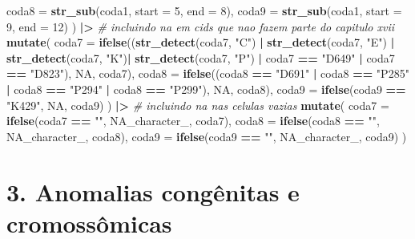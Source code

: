 \documentclass[
]{article}
\newenvironment{Shaded}{\begin{snugshade}}{\end{snugshade}}
\newcommand{\AttributeTok}[1]{\textcolor[rgb]{0.13,0.29,0.53}{#1}}
\newcommand{\CommentTok}[1]{\textcolor[rgb]{0.56,0.35,0.01}{\textit{#1}}}
\newcommand{\ConstantTok}[1]{\textcolor[rgb]{0.56,0.35,0.01}{#1}}
\newcommand{\DecValTok}[1]{\textcolor[rgb]{0.00,0.00,0.81}{#1}}
\newcommand{\FunctionTok}[1]{\textcolor[rgb]{0.13,0.29,0.53}{\textbf{#1}}}
\newcommand{\NormalTok}[1]{#1}
\newcommand{\SpecialCharTok}[1]{\textcolor[rgb]{0.81,0.36,0.00}{\textbf{#1}}}
\newcommand{\StringTok}[1]{\textcolor[rgb]{0.31,0.60,0.02}{#1}}
\begin{document}
\begin{Shaded}
\begin{Highlighting}[]
    \AttributeTok{coda8 =} \FunctionTok{str\_sub}\NormalTok{(coda1, }\AttributeTok{start =} \DecValTok{5}\NormalTok{, }\AttributeTok{end =} \DecValTok{8}\NormalTok{),}
    \AttributeTok{coda9 =} \FunctionTok{str\_sub}\NormalTok{(coda1, }\AttributeTok{start =} \DecValTok{9}\NormalTok{, }\AttributeTok{end =} \DecValTok{12}\NormalTok{)}
\NormalTok{  ) }\SpecialCharTok{|\textgreater{}}
  \CommentTok{\# incluindo na em cids que nao fazem parte do capitulo xvii}
  \FunctionTok{mutate}\NormalTok{(}
    \AttributeTok{coda7 =} \FunctionTok{ifelse}\NormalTok{((}\FunctionTok{str\_detect}\NormalTok{(coda7, }\StringTok{"C"}\NormalTok{) }\SpecialCharTok{|} \FunctionTok{str\_detect}\NormalTok{(coda7, }\StringTok{"E"}\NormalTok{) }\SpecialCharTok{|}
                     \FunctionTok{str\_detect}\NormalTok{(coda7, }\StringTok{"K"}\NormalTok{)}\SpecialCharTok{|} \FunctionTok{str\_detect}\NormalTok{(coda7, }\StringTok{"P"}\NormalTok{) }\SpecialCharTok{|}
\NormalTok{                      coda7 }\SpecialCharTok{==} \StringTok{"D649"} \SpecialCharTok{|}\NormalTok{ coda7 }\SpecialCharTok{==} \StringTok{"D823"}\NormalTok{), }\ConstantTok{NA}\NormalTok{, coda7),}
    \AttributeTok{coda8 =} \FunctionTok{ifelse}\NormalTok{((coda8 }\SpecialCharTok{==} \StringTok{"D691"} \SpecialCharTok{|}\NormalTok{ coda8 }\SpecialCharTok{==} \StringTok{"P285"} \SpecialCharTok{|}\NormalTok{ coda8 }\SpecialCharTok{==} \StringTok{"P294"} \SpecialCharTok{|}
\NormalTok{                     coda8 }\SpecialCharTok{==} \StringTok{"P299"}\NormalTok{), }\ConstantTok{NA}\NormalTok{, coda8),}
    \AttributeTok{coda9 =} \FunctionTok{ifelse}\NormalTok{(coda9 }\SpecialCharTok{==} \StringTok{"K429"}\NormalTok{, }\ConstantTok{NA}\NormalTok{, coda9)}
\NormalTok{  ) }\SpecialCharTok{|\textgreater{}}
  \CommentTok{\# incluindo na nas celulas vazias}
  \FunctionTok{mutate}\NormalTok{(}
    \AttributeTok{coda7 =} \FunctionTok{ifelse}\NormalTok{(coda7 }\SpecialCharTok{==} \StringTok{""}\NormalTok{, }\ConstantTok{NA\_character\_}\NormalTok{, coda7),}
    \AttributeTok{coda8 =} \FunctionTok{ifelse}\NormalTok{(coda8 }\SpecialCharTok{==} \StringTok{""}\NormalTok{, }\ConstantTok{NA\_character\_}\NormalTok{, coda8),}
    \AttributeTok{coda9 =} \FunctionTok{ifelse}\NormalTok{(coda9 }\SpecialCharTok{==} \StringTok{""}\NormalTok{, }\ConstantTok{NA\_character\_}\NormalTok{, coda9)}
\NormalTok{ )}
\end{Highlighting}
\end{Shaded}

\newpage

\hypertarget{anomalias-conguxeanitas-e-cromossuxf4micas}{%
\section{3. Anomalias congênitas e
cromossômicas}\label{anomalias-conguxeanitas-e-cromossuxf4micas}}
\end{document}
